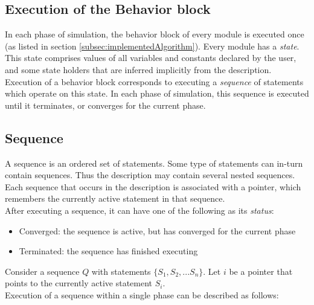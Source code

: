 	\subsection{Execution of the Behavior block}
	In each phase of simulation, the behavior block
	of every module is executed once (as listed in section \ref{subsec:implementedAlgorithm}).
	Every module has a \emph{state}. This state comprises values of all variables and
	constants declared by the user, and some state holders that are
	inferred implicitly from the description.  Execution of a behavior block
	corresponds to executing a \emph{sequence} of statements which operate
	on this state. In each phase of simulation, this sequence is executed
	until it terminates, or converges for the current phase.\\

	\subsection{Sequence}
	A sequence is an ordered set of statements.
	Some type of statements can in-turn contain sequences.
	Thus the description may contain several nested sequences. 
	Each sequence that occurs in the description is associated with a pointer, 
	which remembers the currently active statement in that sequence.\\


	After executing a sequence, it can have 
	one of the following as its \emph{status}:
	\begin{itemize}
	\item Converged: the sequence is active, but has converged for the current phase
	\item Terminated: the sequence has finished executing
	\end{itemize}


	Consider a sequence $Q$ with statements
	$\{S_1,S_2,...S_n\}$. Let $i$ be a pointer that points 
	to the currently active statement $S_i$.\\


	Execution of a sequence within a single phase can be described as follows:\\

	\begin{algorithmic}
	\Else 
		\Loop
			\EndIf
		\EndLoop
	\EndIf
	\end{algorithmic}



